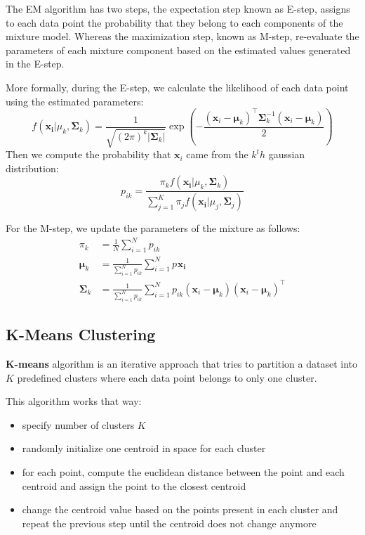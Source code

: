 \documentclass[12pt]{report}
\begin{document}
            The EM algorithm has two steps, the expectation step known as E-step, assigns to each data point the probability that they belong to each
            components of the mixture model. Whereas the maximization step, known as M-step, re-evaluate the parameters of each mixture component based on the estimated values generated in the E-step.
            
            More formally, during the E-step, we calculate the likelihood of each data point using the estimated parameters:
            \begin{equation}
                f(\boldsymbol{x_i}|\mu_k, \boldsymbol{\Sigma}_k) = \frac{1}{\sqrt{(2\pi)^k|\boldsymbol{\Sigma}_k|}} \exp\left(-\frac{(\boldsymbol{x}_i - \boldsymbol{\mu}_k)^\top \boldsymbol{\Sigma}_k^{-1}(\boldsymbol{x}_i - \boldsymbol{\mu}_k)}{2}\right)
            \end{equation}
            Then we compute the probability that $\boldsymbol{x}_i$ came from the $k^th$ gaussian distribution:
            \begin{equation}
                p_{ik} = \frac{\pi_k f(\boldsymbol{x_i}|\mu_k, \boldsymbol{\Sigma}_k)}{\sum_{j=1}^{K} \pi_j f(\boldsymbol{x_i}|\mu_j, \boldsymbol{\Sigma}_j)}
            \end{equation}
            
            For the M-step, we update the parameters of the mixture as follows:
            \begin{align}
                \pi_k &= \frac{1}{N}\sum_{i=1}^{N} p_{ik}\\
                \boldsymbol{\mu}_k &= \frac{1}{\sum_{i=1}^{N} p_{ik}} \sum_{i=1}^{N} p_{} \boldsymbol{x_i}\\
                \boldsymbol{\Sigma}_k &= \frac{1}{\sum_{i=1}^{N} p_{ik}} \sum_{i=1}^{N} p_{ik} (\boldsymbol{x}_i - \boldsymbol{\mu}_k) (\boldsymbol{x}_i - \boldsymbol{\mu}_k)^\top
            \end{align}
            
    
        \subsection{K-Means Clustering}
            \textbf{K-means} algorithm is an iterative approach that tries to partition a dataset into $K$ predefined clusters where each data point belongs to only one cluster. 
            
            This algorithm works that way:
            \begin{itemize}
                \item specify number of clusters $K$
                \item randomly initialize one centroid in space for each cluster
                \item for each point, compute the euclidean distance between the point and each centroid and assign the point to the closest centroid
                \item change the centroid value based on the points present in each cluster and repeat the previous step until the centroid does not change anymore
            \end{itemize}
            
\end{document}

